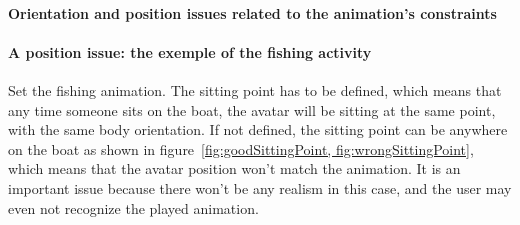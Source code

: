 	\paragraph{Orientation and position issues related to the animation's constraints}

\paragraph{A position issue: the exemple of the fishing activity}
\label{sittingpoint}

Set the fishing animation.
The sitting point has to be defined, which means that any time someone sits on the boat, the avatar will be sitting at the same point, with the same body orientation. If not defined, the sitting point can be anywhere on the boat as shown in figure~\ref{fig:goodSittingPoint, fig:wrongSittingPoint}, which means that the avatar position won't match the animation. It is an important issue because there won't be any realism in this case, and the user may even not recognize the played animation.

